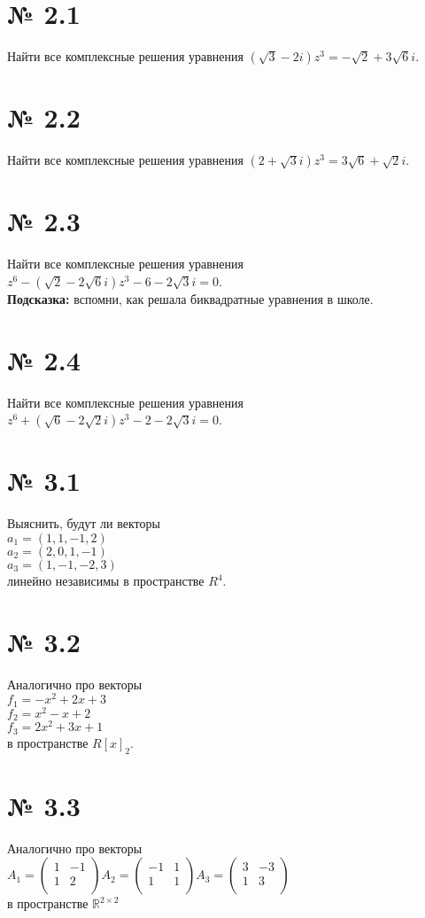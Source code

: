 \documentclass[a4paper,11pt]{report}
\begin{document}
\section{№ 2.1}
Найти все комплексные решения уравнения $(\sqrt{3} - 2i)z^3 = -\sqrt{2} + 3\sqrt{6}i$.\\
\section{№ 2.2}
Найти все комплексные решения уравнения $(2 + \sqrt{3}i)z^3 = 3\sqrt{6} + \sqrt{2}i$.\\
\section{№ 2.3}
Найти все комплексные решения уравнения $z^6 - (\sqrt{2} - 2\sqrt{6}i)z^3 - 6 - 2\sqrt{3}i = 0$.\\
\textbf{Подсказка:} вспомни, как решала биквадратные уравнения в школе.
\section{№ 2.4}
Найти все комплексные решения уравнения $z^6 + (\sqrt{6} - 2\sqrt{2}i)z^3 - 2 - 2\sqrt{3}i = 0$.\\
\section{№ 3.1}
Выяснить, будут ли векторы\\
$a_1 = (1, 1, -1, 2)$\\
$a_2 = (2, 0, 1, -1)$\\
$a_3 = (1, -1, -2, 3)$\\
линейно независимы в пространстве $R^4$.
\section{№ 3.2}
Аналогично про векторы\\
$f_1 = -x^2 + 2x + 3$\\
$f_2 = x^2 - x + 2$\\
$f_3 = 2x^2 + 3x + 1$\\
в пространстве $R[x]_2$.
\section{№ 3.3} 
Аналогично про векторы\\
$A_1 =
\begin{pmatrix}
1 & -1\\
1 & 2\\
\end{pmatrix}
A_2 =
\begin{pmatrix}
-1 & 1\\
1 & 1\\
\end{pmatrix}
A_3 =
\begin{pmatrix}
3 & -3\\
1 & 3\\
\end{pmatrix}
$\\
в пространстве $\mathbb{R}^{2\times2}$
\end{document}
